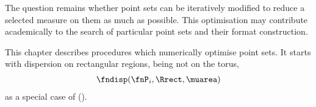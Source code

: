 %
The question remains whether point sets can be iteratively modified to reduce a selected measure on them as much as possible. This optimisation may contribute academically to the search of particular point sets and their format construction.

This chapter describes procedures which numerically optimise point sets. It starts with dispersion on rectangular regions, being not on the torus,
\begin{align*}
  \fndisp(\fnP_i, \Rrect, \muarea)
\end{align*}
as a special case of ().



\clearpage
